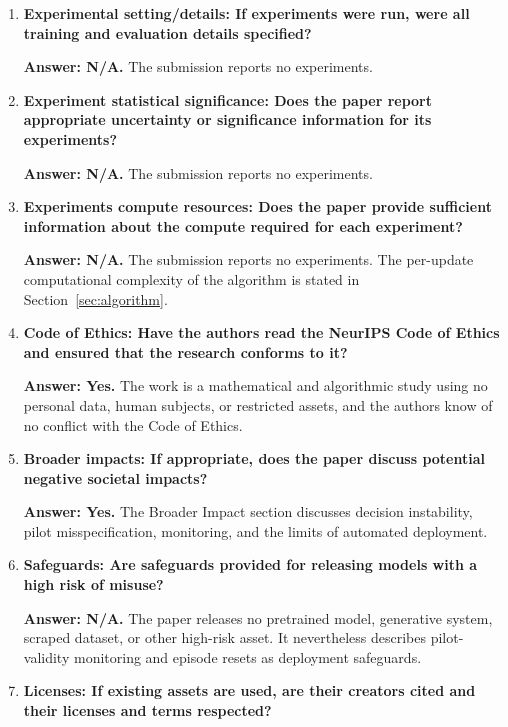 \begin{enumerate}
\textbf{Answer: N/A.} The submission reports no experiments and uses no dataset.

\item \textbf{Experimental setting/details: If experiments were run, were all training and evaluation details specified?}

\textbf{Answer: N/A.} The submission reports no experiments.

\item \textbf{Experiment statistical significance: Does the paper report appropriate uncertainty or significance information for its experiments?}

\textbf{Answer: N/A.} The submission reports no experiments.

\item \textbf{Experiments compute resources: Does the paper provide sufficient information about the compute required for each experiment?}

\textbf{Answer: N/A.} The submission reports no experiments. The per-update computational complexity of the algorithm is stated in Section~\ref{sec:algorithm}.

\item \textbf{Code of Ethics: Have the authors read the NeurIPS Code of Ethics and ensured that the research conforms to it?}

\textbf{Answer: Yes.} The work is a mathematical and algorithmic study using no personal data, human subjects, or restricted assets, and the authors know of no conflict with the Code of Ethics.

\item \textbf{Broader impacts: If appropriate, does the paper discuss potential negative societal impacts?}

\textbf{Answer: Yes.} The Broader Impact section discusses decision instability, pilot misspecification, monitoring, and the limits of automated deployment.

\item \textbf{Safeguards: Are safeguards provided for releasing models with a high risk of misuse?}

\textbf{Answer: N/A.} The paper releases no pretrained model, generative system, scraped dataset, or other high-risk asset. It nevertheless describes pilot-validity monitoring and episode resets as deployment safeguards.

\item \textbf{Licenses: If existing assets are used, are their creators cited and their licenses and terms respected?}


\end{enumerate}
